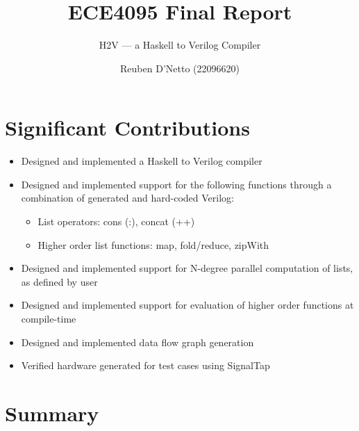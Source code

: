\documentclass[english,onecolumn]{scrartcl}
\begin{document}
\title{ECE4095 Final Report}
\subtitle{H2V --- a Haskell to Verilog Compiler}
\author{Reuben D'Netto (22096620)}

\maketitle
\tableofcontents{}
\pagebreak{}


\section{Significant Contributions}
\begin{itemize}
    \item Designed and implemented a Haskell to Verilog compiler
    \item Designed and implemented support for the following functions through a combination of generated and hard-coded Verilog:
        \begin{itemize}
            \item List operators: cons (:), concat (++)
            \item Higher order list functions: map, fold/reduce, zipWith
        \end{itemize}
    \item Designed and implemented support for N-degree parallel computation of lists, as defined by user
    \item Designed and implemented support for evaluation of higher order functions at compile-time
    \item Designed and implemented data flow graph generation
    \item Verified hardware generated for test cases using SignalTap
\end{itemize}

\newcommand\invisiblesection[1]{%
    \refstepcounter{section}%
    \addcontentsline{toc}{section}{\protect\numberline{\thesection}#1}%
    \sectionmark{#1}}




\section{Summary}
\end{document}
